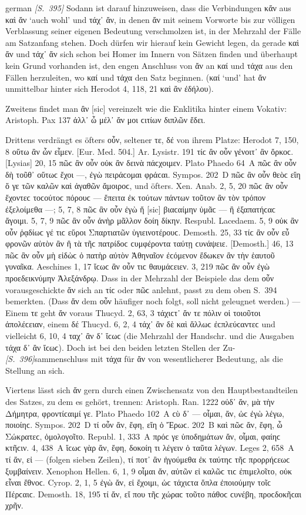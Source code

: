 \begin{otherlanguage*}{german}
\hypertarget{p395}{\emph{[S.~395]}}\label{p395} Sodann ist darauf hinzuweisen, dass die Verbindungen κἄν aus καὶ ἄν ‘auch wohl’ und τάχ᾽ ἄν, in denen ἄν mit seinem Vorworte bis zur völligen Verblassung seiner eigenen Bedeutung verschmolzen ist, in der Mehrzahl der Fälle am Satzanfang stehen. Doch dürfen wir hierauf kein Gewicht legen, da gerade καὶ ἄν und τάχ᾽ ἄν sich schon bei Homer im Innern von Sätzen finden und überhaupt kein Grund vorhanden ist, den engen Anschluss von ἄν an καί und τάχα aus den Fällen herzuleiten, wo καί und τάχα den Satz beginnen. (καί ‘und’ hat ἄν unmittelbar hinter sich Herodot 4, 118, 21 καὶ ἂν ἐδήλου).

Zweitens findet man ἂν [sic] vereinzelt wie die Enklitika hinter einem Vokativ: Aristoph. Pax 137 ἀλλ᾽ ὦ μέλ᾽ ἄν μοι ϲιτίων διπλῶν ἔδει.

Drittens verdrängt es öfters οὖν, seltener τε, δέ von ihrem Platze: Herodot 7, 150, 8 οὕτω ἂν ὦν εἶμεν. [Eur. Med. 504.] Ar. Lysistr. 191 τίϲ ἂν οὖν γένοιτ᾽ ἂν ὄρκοϲ. [Lysias] 20, 15 πῶϲ ἂν οὖν οὐκ ἂν δεινὰ πάϲχοιμεν. Plato Phaedo 64~Α πῶϲ ἂν οὖν δὴ τοῦθ᾽ οὕτωϲ ἔχοι —, ἐγὼ πειράϲομαι φράϲαι. Sympos. 202~D πῶϲ ἂν οὖν θεὸϲ εἴη ὅ γε τῶν καλῶν καὶ ἀγαθῶν ἄμοιροϲ, und öfters. Xen. Anab. 2, 5, 20 πῶϲ ἂν οὖν ἔχοντεϲ τοϲούτοϲ πόρουϲ — ἔπειτα ἐκ τούτων πάντων τοῦτον ἂν τὸν τρόπον ἐξελοίμεθα —; 5, 7, 8 πῶϲ ἂν οὖν ἐγὼ ἤ [sic] βιαϲαίμην ὑμᾶϲ — ἢ ἐξαπατήϲαϲ ἄγοιμι. 5, 7, 9 πῶϲ ἂν οὖν ἀνὴρ μᾶλλον δοίη δίκην. Respubl. Lacedaem. 5, 9 οὐκ ἂν οὖν ῥᾳδίωϲ γέ τιϲ εὕροι Σπαρτιατῶν ὑγιεινοτέρουϲ. Demosth. 25, 33 τίϲ ἂν οὖν εὖ φρονῶν αὑτὸν ἂν ἢ τὰ τῆϲ πατρίδοϲ ϲυμφέροντα ταύτῃ ϲυνάψειε. [Demosth.] 46, 13 πῶϲ ἂν οὖν μὴ εἰδὼϲ ὁ πατὴρ αὐτὸν Ἀθηναῖον ἐϲόμενον ἔδωκεν ἂν τὴν ἑαυτοῦ γυναῖκα. Aeschines 1, 17 ἴϲωϲ ἂν οὖν τιϲ θαυμάϲειεν. 3, 219 πῶϲ ἂν οὖν ἐγὼ προεδεικνύμην Ἀλεξάνδρῳ. Dass in der Mehrzahl der Beispiele das dem οὖν vorausgeschickte ἄν sich an τίϲ oder πῶϲ anlehnt, passt zu dem oben S.~394 bemerkten. (Dass ἄν dem οὖν häufiger noch folgt, soll nicht geleugnet werden.) — Einem τε geht ἄν voraus Thucyd. 2, 63, 3 τάχιϲτ᾽ ἄν τε πόλιν οἱ τοιοῦτοι ἀπολέϲειαν, einem δέ Thucyd. 6, 2, 4 τάχ᾽ ἂν δὲ καὶ ἄλλωϲ ἐϲπλεύϲαντεϲ und vielleicht 6, 10, 4 ταχ᾽ ἂν δ᾽ ἴϲωϲ (die Mehrzahl der Handschr. und die Ausgaben τάχα δ᾽ ἂν ἴϲωϲ). Doch ist bei den beiden letzten Stellen der Zu-\hypertarget{p396}{\emph{[S.~396]}}\label{p396}sammenschluss mit τάχα für ἄν von wesentlicherer Bedeutung, als die Stellung an sich.

Viertens lässt sich ἄν gern durch einen Zwischensatz von den Hauptbestandteilen des Satzes, zu dem es gehört, trennen: Aristoph. Ran. 1222 οὐδ᾽ ἄν, μὰ τὴν Δήμητρα, φροντίϲαιμί γε. Plato Phaedo 102~A ϲὺ δ᾽ — οἶμαι, ἄν, ὡϲ ἐγὼ λέγω, ποιοίηϲ. Sympos. 202~D τί οὖν ἄν, ἔφη, εἴη ὁ Ἔρωϲ. 202~Β καὶ πῶϲ ἄν, ἔφη, ὦ Σώκρατεϲ, ὁμολογοῖτο. Republ. 1, 333~Α πρόϲ γε ὑποδημάτων ἄν, οἶμαι, φαίηϲ κτῆϲιν. 4, 438~A ἴϲωϲ γὰρ ἄν, ἔφη, δοκοίη τι λέγειν ὁ ταῦτα λέγων. Leges 2, 658~Α τί ἄν, εἰ — (folgen sieben Zeilen), τί ποτ᾽ ἂν ἡγούμεθα ἐκ ταύτηϲ τῆϲ προρρήϲεωϲ ξυμβαίνειν. Xenophon Hellen. 6, 1, 9 οἶμαι ἄν, αὐτῶν εἰ καλῶϲ τιϲ ἐπιμελοῖτο, οὐκ εἶναι ἔθνοϲ. Cyrop. 2, 1, 5 ἐγὼ ἄν, εἰ ἔχοιμι, ὡϲ τάχιϲτα ὅπλα ἐποιούμην τοῖϲ Πέρϲαιϲ. Demosth. 18, 195 τί ἄν, εἴ που τῆϲ χώραϲ τοῦτο πάθοϲ ϲυνέβη, προϲδοκῆϲαι χρῆν.


\end{otherlanguage*}
